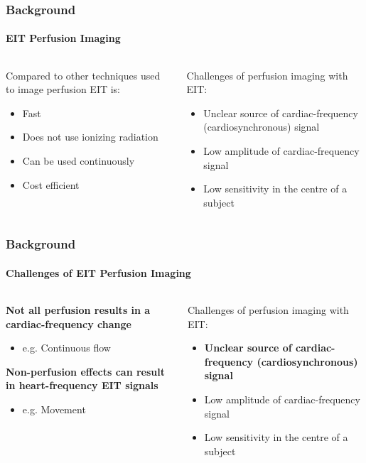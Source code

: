 \documentclass[10pt,    %
    english,            %
    xcolor=table,       %
    envcountsect,        %
    aspectratio=1610
]{beamer}
\begin{document}
\begin{frame}
	\frametitle{Background}
	\framesubtitle{EIT Perfusion Imaging}
\begin{columns}[c]
\begin{column}{0.5\textwidth}
	Compared to other techniques used to image perfusion EIT is: \\ \vspace{2mm}
	\begin{itemize}
		\item Fast 
		\item Does not use ionizing radiation 
		\item Can be used continuously 
		\item Cost efficient 
	\end{itemize}
\end{column}
\begin{column}{0.5\textwidth}
	Challenges of perfusion imaging with EIT: \\ \vspace{5mm}
	\begin{itemize}
		\item Unclear source of cardiac-frequency (cardiosynchronous) signal
		\item Low amplitude of cardiac-frequency signal
		\item Low sensitivity in the centre of a subject
	\end{itemize}
\end{column}
\end{columns}
\end{frame}

\begin{frame}
	\frametitle{Background}
	\framesubtitle{Challenges of EIT Perfusion Imaging}
\begin{columns}[c]
\begin{column}{0.5\textwidth}
\textbf{\large Not all perfusion results in a cardiac-frequency change}
\begin{itemize}
	\item e.g. Continuous flow
\end{itemize} %
\vspace{10mm}
\textbf{\large Non-perfusion effects can result in heart-frequency EIT signals}
\begin{itemize}
	\item e.g. Movement
\end{itemize}

\end{column}
\begin{column}{0.5\textwidth}
	Challenges of perfusion imaging with EIT: \\ \vspace{5mm}
	\begin{itemize}
		\item \textbf{Unclear source of cardiac-frequency (cardiosynchronous) signal}
		\item Low amplitude of cardiac-frequency signal
		\item Low sensitivity in the centre of a subject
	\end{itemize}
\end{column}
\end{columns}
\end{frame}
\end{document}
